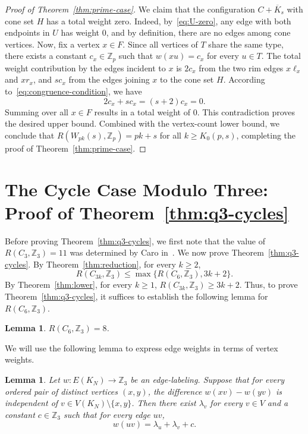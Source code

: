 \documentclass[11pt]{article}
\newtheorem{lemma}[theorem]{Lemma}
\theoremstyle{remark}
\newcommand{\Z}{\mathbb Z}
\begin{document}
\begin{proof}[Proof of Theorem~\ref{thm:prime-case}]
    We claim that the configuration $C+\overline K_s$ with cone set $H$ has a total weight zero.
    Indeed, by~\eqref{eq:U-zero}, any edge with both endpoints in $U$ has weight $0$, and by definition, there are no edges among cone vertices.
    Now, fix a vertex $x\in F$.
    Since all vertices of $T$ share the same type, there exists a constant $c_x\in\Z_p$ such that $w(xu)=c_x$ for every $u\in T$.
    The total weight contribution by the edges incident to $x$ is $2c_x$ from the two rim edges $x\ell_x$ and $xr_x$, and $sc_x$ from the edges joining $x$ to the cone set $H$.
    According to~\eqref{eq:congruence-condition}, we have
    \[
        2c_x+sc_x=(s+2)c_x=0.
    \]
    Summing over all $x\in F$ results in a total weight of $0$.
    This contradiction proves the desired upper bound.
    Combined with the vertex-count lower bound, we conclude that
    $R(W_{pk}(s),\Z_p)=pk+s$ for all $k\ge K_0(p,s)$, completing the proof of Theorem~\ref{thm:prime-case}.
\end{proof}





\section{The Cycle Case Modulo Three: Proof of Theorem~\ref{thm:q3-cycles}}

Before proving Theorem~\ref{thm:q3-cycles}, we first note that the value of $R(C_{3},\Z_3)=11$ was determined by Caro in~\cite{Caro1992Complete}.
We now prove Theorem~\ref{thm:q3-cycles}.
By Theorem~\ref{thm:reduction}, for every $k\ge 2$,
\[
    R(C_{3k},\Z_3)\le \max\{R(C_{6},\Z_3),3k+2\}.
\]
By Theorem~\ref{thm:lower}, for every $k\ge 1$,
$R(C_{3k},\Z_3)\ge 3k+2$.
Thus, to prove Theorem~\ref{thm:q3-cycles}, it suffices to establish the following lemma for $R(C_6,\Z_3).$

\begin{lemma}\label{lem:z3-c6-base}
    $R(C_6,\Z_3)=8$.
\end{lemma}

We will use the following lemma to express edge weights in terms of vertex weights.

\begin{lemma}\label{lem:z3-affine}
    Let $w\colon E(K_N)\to \Z_3$ be an edge-labeling.  Suppose that for every ordered pair of distinct vertices $(x,y)$, the difference
    $w(xv)-w(yv)$
    is independent of $v\in V(K_N)\setminus\{x,y\}$.
    Then there exist $\lambda_v$ for every $v\in V$ and a constant $c\in\Z_3$ such that for every edge $uv$,
    \[
        w(uv)=\lambda_u+\lambda_v+c.
    \]
\end{lemma}
\end{document}
